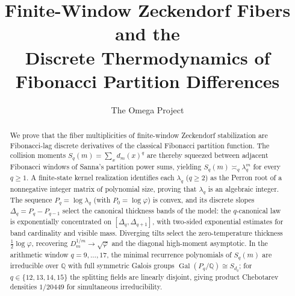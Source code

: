 \documentclass[12pt,reqno]{amsart}
\title[Finite-window Zeckendorf fibers]{%
  Finite-Window Zeckendorf Fibers and the\\
  Discrete Thermodynamics of Fibonacci Partition Differences}
\author{The Omega Project}
\date{}
\theoremstyle{plain}
\theoremstyle{definition}
\numberwithin{equation}{section}
\newcommand{\QQ}{\mathbb{Q}}
\begin{document}
\begin{abstract}
We prove that the fiber multiplicities of finite-window Zeckendorf
stabilization are Fibonacci-lag discrete derivatives of the classical
Fibonacci partition function.  The collision moments
$S_q(m)=\sum_{x}d_m(x)^q$ are thereby squeezed between adjacent
Fibonacci windows of Sanna's partition power sums, yielding
$S_q(m)\asymp_q\lambda_q^m$ for every $q\ge 1$.  A finite-state
kernel realization identifies each $\lambda_q$ ($q\ge 2$) as the
Perron root of a nonnegative integer matrix of polynomial size,
proving that $\lambda_q$ is an algebraic integer.  The sequence
$P_q=\log\lambda_q$ (with $P_0=\log\varphi$) is convex, and its
discrete slopes $\Delta_q=P_q-P_{q-1}$ select the canonical
thickness bands of the model: the $q$-canonical law is exponentially
concentrated on $[\Delta_q,\Delta_{q+1}]$, with two-sided exponential
estimates for band cardinality and visible mass.  Diverging tilts
select the zero-temperature thickness $\frac12\log\varphi$, recovering
$D_m^{1/m}\to\sqrt{\varphi}$ and the diagonal high-moment asymptotic.
In the arithmetic window $q=9,\dots,17$, the minimal recurrence
polynomials of $S_q(m)$ are irreducible over $\QQ$ with full
symmetric Galois groups $\operatorname{Gal}(P_q/\QQ)\cong S_{d_q}$;
for $q\in\{12,13,14,15\}$ the splitting fields are linearly
disjoint, giving product Chebotarev densities $1/20449$ for
simultaneous irreducibility.
\end{abstract}

\maketitle










\appendix




\end{document}

